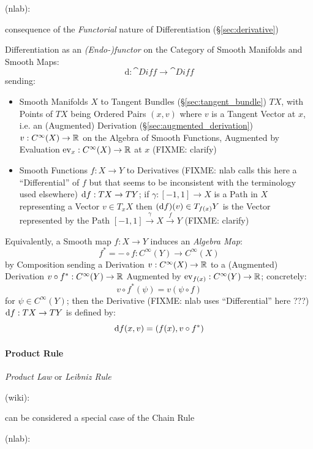 {(nlab):

consequence of the \emph{Functorial} nature of Differentiation
(\S\ref{sec:derivative})

Differentiation as an \emph{(Endo-)functor} on the Category of Smooth Manifolds
and Smooth Maps:
\[
  \mathrm{d} : \cat{Diff} \rightarrow \cat{Diff}
\]
sending:
\begin{itemize}
  \item Smooth Manifolds $X$ to Tangent Bundles (\S\ref{sec:tangent_bundle}) $T
    X$, with Points of $T X$ being Ordered Pairs $(x, v)$ where $v$ is a Tangent
    Vector at $x$, i.e. an (Augmented) Derivation
    (\S\ref{sec:augmented_derivation}) $v : C^\infty(X) \rightarrow \mathbb{R}$ on
    the Algebra of Smooth Functions, Augmented by Evaluation $\mathrm{ev}_x :
    C^\infty(X) \rightarrow \mathbb{R}$ at $x$ (FIXME: clarify)
  \item Smooth Functions $f : X \rightarrow Y$ to Derivatives (FIXME: nlab calls
    this here a ``Differential'' of $f$ but that seems to be inconsistent with
    the terminology used elsewhere) $\mathrm{d}f : TX \rightarrow TY$; if $\gamma
    : [-1,1] \rightarrow X$ is a Path in $X$ representing a Vector
    $v \in T_x{X}$ then $(\mathrm{d}f)(v) \in T_{f(x)}Y$ is the Vector represented
    by the Path $[-1, 1] \xrightarrow{\gamma} X \xrightarrow{f} Y$
    (FIXME: clarify)
\end{itemize}
Equivalently, a Smooth map $f : X \rightarrow Y$ induces an \emph{Algebra Map}:
\[
  f^* = - \circ f : C^\infty(Y) \rightarrow C^\infty(X)
\]
by Composition sending a Derivation $v : C^\infty(X) \rightarrow \mathbb{R}$ to a
(Augmented) Derivation $v \circ f^* : C^\infty(Y) \rightarrow \mathbb{R}$ Augmented
by $\mathrm{ev}_{f(x)} : C^\infty(Y) \rightarrow \mathbb{R}$; concretely:
\[
  v \circ f^*(\psi) = v(\psi \circ f)
\]
for $\psi \in C^\infty(Y)$; then the Derivative (FIXME: nlab uses
``Differential'' here ???) $\mathrm{d}f : T X \rightarrow T Y$ is defined by:
\[
  \mathrm{d}f(x,v) = (f(x), v \circ f^*)
\]



\paragraph{Product Rule}\label{sec:product_rule}\hfill

\emph{Product Law} or \emph{Leibniz Rule}

(wiki):

can be considered a special case of the Chain Rule

(nlab):

}
